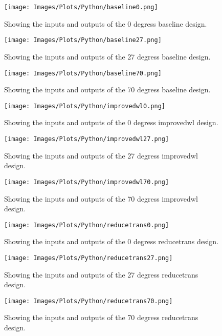 \begin{figure}[htb] 
    \centering
    \texttt{[image: Images/Plots/Python/baseline0.png]} 
    \caption{Showing the inputs and outputs of the 0 degress baseline design.} 
    \label{fig:python0baseline} 
\end{figure}
\begin{figure}[htb] 
    \centering
    \texttt{[image: Images/Plots/Python/baseline27.png]} 
    \caption{Showing the inputs and outputs of the 27 degress baseline design.} 
    \label{fig:python27baseline} 
\end{figure}
\begin{figure}[htb] 
    \centering
    \texttt{[image: Images/Plots/Python/baseline70.png]} 
    \caption{Showing the inputs and outputs of the 70 degress baseline design.} 
    \label{fig:python70baseline} 
\end{figure}
\begin{figure}[htb] 
    \centering
    \texttt{[image: Images/Plots/Python/improvedwl0.png]} 
    \caption{Showing the inputs and outputs of the 0 degress improvedwl design.} 
    \label{fig:python0improvedwl} 
\end{figure}
\begin{figure}[htb] 
    \centering
    \texttt{[image: Images/Plots/Python/improvedwl27.png]} 
    \caption{Showing the inputs and outputs of the 27 degress improvedwl design.} 
    \label{fig:python27improvedwl} 
\end{figure}
\begin{figure}[htb] 
    \centering
    \texttt{[image: Images/Plots/Python/improvedwl70.png]} 
    \caption{Showing the inputs and outputs of the 70 degress improvedwl design.} 
    \label{fig:python70improvedwl} 
\end{figure}
\begin{figure}[htb] 
    \centering
    \texttt{[image: Images/Plots/Python/reducetrans0.png]} 
    \caption{Showing the inputs and outputs of the 0 degress reducetrans design.} 
    \label{fig:python0reducetrans} 
\end{figure}
\begin{figure}[htb] 
    \centering
    \texttt{[image: Images/Plots/Python/reducetrans27.png]} 
    \caption{Showing the inputs and outputs of the 27 degress reducetrans design.} 
    \label{fig:python27reducetrans} 
\end{figure}
\begin{figure}[htb] 
    \centering
    \texttt{[image: Images/Plots/Python/reducetrans70.png]} 
    \caption{Showing the inputs and outputs of the 70 degress reducetrans design.} 
    \label{fig:python70reducetrans} 
\end{figure}
